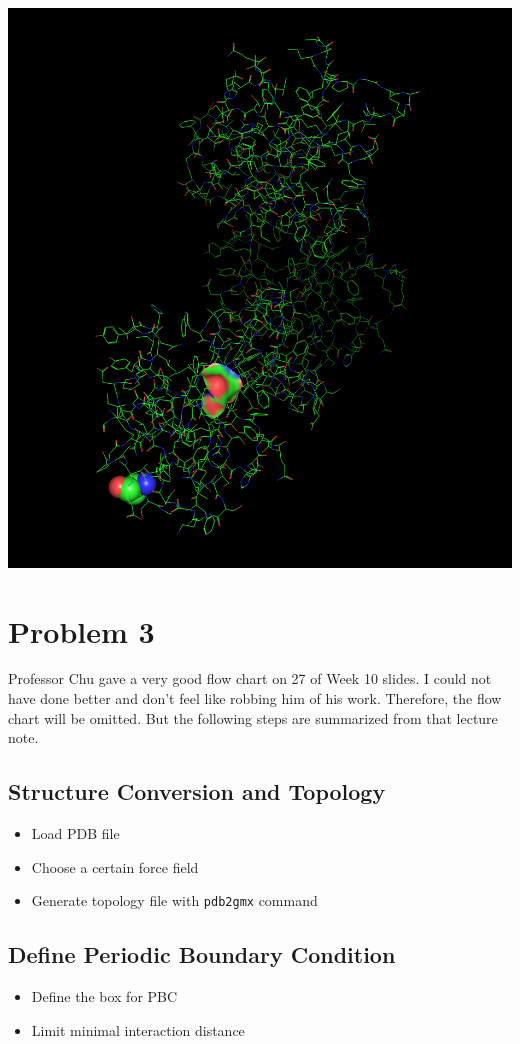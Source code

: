 \documentclass[11pt]{article}
\begin{document}
\begin{center}
\includegraphics[width=.9\linewidth]{./protein.png}
\end{center}

\section{Problem 3}
\label{sec:orgafb7d97}
Professor Chu gave a very good flow chart on 27 of Week 10 slides. I could not
have done better and don't feel like robbing him of his work. Therefore, the
flow chart will be omitted. But the following steps are summarized from that
lecture note.
\subsection{Structure Conversion and Topology}
\label{sec:org2662723}
\begin{itemize}
\item Load PDB file
\item Choose a certain force field
\item Generate topology file with \texttt{pdb2gmx} command
\end{itemize}

\subsection{Define Periodic Boundary Condition}
\label{sec:orgc2380db}
\begin{itemize}
\item Define the box for PBC
\item Limit minimal interaction distance
\end{itemize}
\end{document}
